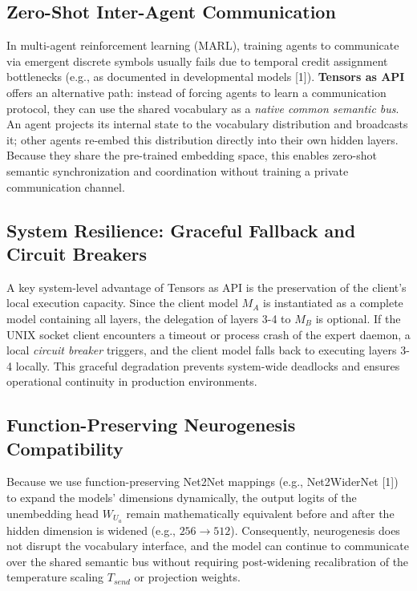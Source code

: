 \documentclass{article}
\begin{document}
\subsection{Zero-Shot Inter-Agent Communication}
In multi-agent reinforcement learning (MARL), training agents to communicate via emergent discrete symbols usually fails due to temporal credit assignment bottlenecks (e.g., as documented in developmental models [1]). \textbf{Tensors as API} offers an alternative path: instead of forcing agents to learn a communication protocol, they can use the shared vocabulary as a \textit{native common semantic bus}. An agent projects its internal state to the vocabulary distribution and broadcasts it; other agents re-embed this distribution directly into their own hidden layers. Because they share the pre-trained embedding space, this enables zero-shot semantic synchronization and coordination without training a private communication channel.

\subsection{System Resilience: Graceful Fallback and Circuit Breakers}
A key system-level advantage of Tensors as API is the preservation of the client's local execution capacity. Since the client model $M_A$ is instantiated as a complete model containing all layers, the delegation of layers 3-4 to $M_B$ is optional. If the UNIX socket client encounters a timeout or process crash of the expert daemon, a local \textit{circuit breaker} triggers, and the client model falls back to executing layers 3-4 locally. This graceful degradation prevents system-wide deadlocks and ensures operational continuity in production environments.

\subsection{Function-Preserving Neurogenesis Compatibility}
Because we use function-preserving Net2Net mappings (e.g., Net2WiderNet [1]) to expand the models' dimensions dynamically, the output logits of the unembedding head $W_{U_a}$ remain mathematically equivalent before and after the hidden dimension is widened (e.g., $256 \to 512$). Consequently, neurogenesis does not disrupt the vocabulary interface, and the model can continue to communicate over the shared semantic bus without requiring post-widening recalibration of the temperature scaling $T_{send}$ or projection weights.
\end{document}
